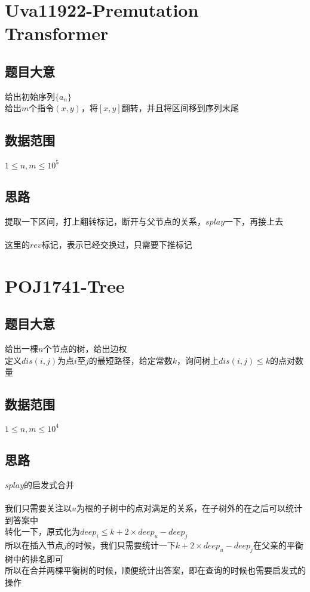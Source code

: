 \documentclass{ctexart}
\numberwithin{equation}{section}
\begin{document}
\begin{flushleft}
  \section{Uva11922-Premutation Transformer}
  \subsection{题目大意}
  给出初始序列$\{a_n\}$\\
  给出$m$个指令$(x,y)$，将$[x,y]$翻转，并且将区间移到序列末尾\\
  \subsection{数据范围}
  $1\le n,m \le 10^5$
  \subsection{思路}
  提取一下区间，打上翻转标记，断开与父节点的关系，$splay$一下，再接上去\\

  ~\\
  
  这里的$rev$标记，表示已经交换过，只需要下推标记\\
  \newpage

  \section{POJ1741-Tree}
  \subsection{题目大意}
  给出一棵$n$个节点的树，给出边权\\
  定义$dis(i,j)$为点$i$至$j$的最短路径，给定常数$k$，询问树上$dis(i,j) \le k$的点对数量\\
  \subsection{数据范围}
  $1\le n,m \le 10^4$
  \subsection{思路}
  $splay$的启发式合并\\
  ~\\
  我们只需要关注以$u$为根的子树中的点对满足的关系，在子树外的在之后可以统计到答案中\\
  转化一下，原式化为$deep_i\le k+2\times deep_{u}-deep_j$\\
  所以在插入节点$j$的时候，我们只需要统计一下$k+2\times deep_{u}-deep_j$在父亲的平衡树中的排名即可\\
  所以在合并两棵平衡树的时候，顺便统计出答案，即在查询的时候也需要启发式的操作\\


\end{flushleft}
\end{document}
